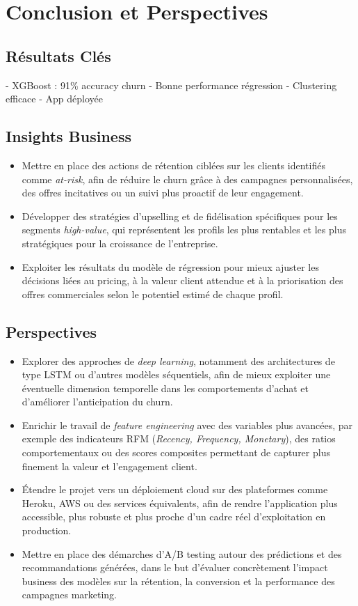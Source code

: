 \documentclass[11pt,a4paper]{article}
\begin{document}
\clearpage



\section{Conclusion et Perspectives}

\subsection{Résultats Clés}
- XGBoost : 91\% accuracy churn
- Bonne performance régression
- Clustering efficace
- App déployée

\subsection{Insights Business}
\begin{itemize}
    \item Mettre en place des actions de rétention ciblées sur les clients identifiés comme \textit{at-risk}, afin de réduire le churn grâce à des campagnes personnalisées, des offres incitatives ou un suivi plus proactif de leur engagement.
    \item Développer des stratégies d'upselling et de fidélisation spécifiques pour les segments \textit{high-value}, qui représentent les profils les plus rentables et les plus stratégiques pour la croissance de l'entreprise.
    \item Exploiter les résultats du modèle de régression pour mieux ajuster les décisions liées au pricing, à la valeur client attendue et à la priorisation des offres commerciales selon le potentiel estimé de chaque profil.
\end{itemize}

\subsection{Perspectives}
\begin{itemize}
    \item Explorer des approches de \textit{deep learning}, notamment des architectures de type LSTM ou d'autres modèles séquentiels, afin de mieux exploiter une éventuelle dimension temporelle dans les comportements d'achat et d'améliorer l'anticipation du churn.
    \item Enrichir le travail de \textit{feature engineering} avec des variables plus avancées, par exemple des indicateurs RFM (\textit{Recency, Frequency, Monetary}), des ratios comportementaux ou des scores composites permettant de capturer plus finement la valeur et l'engagement client.
    \item Étendre le projet vers un déploiement cloud sur des plateformes comme Heroku, AWS ou des services équivalents, afin de rendre l'application plus accessible, plus robuste et plus proche d'un cadre réel d'exploitation en production.
    \item Mettre en place des démarches d'A/B testing autour des prédictions et des recommandations générées, dans le but d'évaluer concrètement l'impact business des modèles sur la rétention, la conversion et la performance des campagnes marketing.
\end{itemize}
\end{document}
